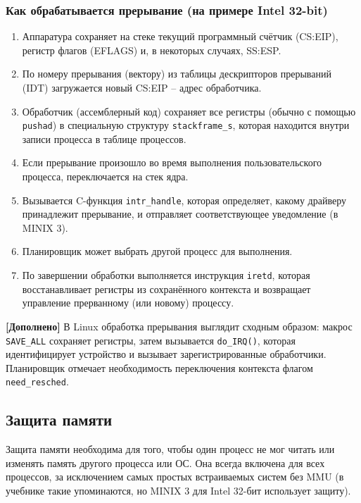 \documentclass[a4paper,12pt]{article}
\begin{document}
\subsubsection{Как обрабатывается прерывание (на примере Intel 32-bit)}
\begin{enumerate}
    \item Аппаратура сохраняет на стеке текущий программный счётчик (CS:EIP), регистр флагов (EFLAGS) и, в некоторых случаях, SS:ESP.
    \item По номеру прерывания (вектору) из таблицы дескрипторов прерываний (IDT) загружается новый CS:EIP – адрес обработчика.
    \item Обработчик (ассемблерный код) сохраняет все регистры (обычно с помощью \texttt{pushad}) в специальную структуру \texttt{stackframe\_s}, которая находится внутри записи процесса в таблице процессов.
    \item Если прерывание произошло во время выполнения пользовательского процесса, переключается на стек ядра.
    \item Вызывается C-функция \texttt{intr\_handle}, которая определяет, какому драйверу принадлежит прерывание, и отправляет соответствующее уведомление (в MINIX 3).
    \item Планировщик может выбрать другой процесс для выполнения.
    \item По завершении обработки выполняется инструкция \texttt{iretd}, которая восстанавливает регистры из сохранённого контекста и возвращает управление прерванному (или новому) процессу.
\end{enumerate}

\textbf{[Дополнено]} В Linux обработка прерывания выглядит сходным образом: макрос \texttt{SAVE\_ALL} сохраняет регистры, затем вызывается \texttt{do\_IRQ()}, которая идентифицирует устройство и вызывает зарегистрированные обработчики. Планировщик отмечает необходимость переключения контекста флагом \texttt{need\_resched}.

\subsection{Защита памяти}
Защита памяти необходима для того, чтобы один процесс не мог читать или изменять память другого процесса или ОС. Она всегда включена для всех процессов, за исключением самых простых встраиваемых систем без MMU (в учебнике такие упоминаются, но MINIX 3 для Intel 32-бит использует защиту).
\end{document}
